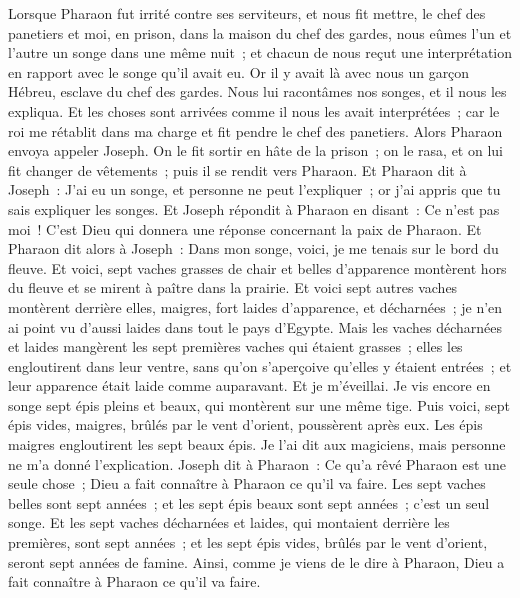 \begin{multicols}{2}
Lorsque Pharaon fut irrité contre ses serviteurs, et nous fit mettre, le chef des panetiers et moi, en prison, dans la maison du chef des gardes,
nous eûmes l'un et l'autre un songe dans une même nuit~; et chacun de nous reçut une interprétation en rapport avec le songe qu'il avait eu.
Or il y avait là avec nous un garçon Hébreu, esclave du chef des gardes. Nous lui racontâmes nos songes, et il nous les expliqua.
Et les choses sont arrivées comme il nous les avait interprétées~; car le roi me rétablit dans ma charge et fit pendre le chef des panetiers.
Alors Pharaon envoya appeler Joseph. On le fit sortir en hâte de la prison~; on le rasa, et on lui fit changer de vêtements~; puis il se rendit vers Pharaon.
Et Pharaon dit à Joseph~: J'ai eu un songe, et personne ne peut l'expliquer~; or j'ai appris que tu sais expliquer les songes.
Et Joseph répondit à Pharaon en disant~: Ce n'est pas moi~! C'est Dieu qui donnera une réponse concernant la paix de Pharaon.
Et Pharaon dit alors à Joseph~: Dans mon songe, voici, je me tenais sur le bord du fleuve.
Et voici, sept vaches grasses de chair et belles d'apparence montèrent hors du fleuve et se mirent à paître dans la prairie.
Et voici sept autres vaches montèrent derrière elles, maigres, fort laides d'apparence, et décharnées~; je n'en ai point vu d'aussi laides dans tout le pays d'Egypte.
Mais les vaches décharnées et laides mangèrent les sept premières vaches qui étaient grasses~;
elles les engloutirent dans leur ventre, sans qu'on s'aperçoive qu'elles y étaient entrées~; et leur apparence était laide comme auparavant. Et je m'éveillai.
Je vis encore en songe sept épis pleins et beaux, qui montèrent sur une même tige.
Puis voici, sept épis vides, maigres, brûlés par le vent d'orient, poussèrent après eux.
Les épis maigres engloutirent les sept beaux épis. Je l'ai dit aux magiciens, mais personne ne m'a donné l'explication. 
Joseph dit à Pharaon~: Ce qu'a rêvé Pharaon est une seule chose~; Dieu a fait connaître à Pharaon ce qu'il va faire.
Les sept vaches belles sont sept années~; et les sept épis beaux sont sept années~; c'est un seul songe.
Et les sept vaches décharnées et laides, qui montaient derrière les premières, sont sept années~; et les sept épis vides, brûlés par le vent d'orient, seront sept années de famine.
Ainsi, comme je viens de le dire à Pharaon, Dieu a fait connaître à Pharaon ce qu'il va faire.

\end{multicols}
